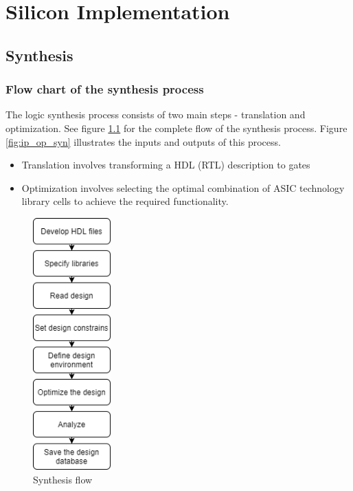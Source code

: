 \documentclass[../main.tex]{subfiles}
\begin{document}
\chapter{Silicon Implementation}
\section{Synthesis}
\subsection{Flow chart of the synthesis process}
The logic synthesis process consists of two main steps - translation and 
optimization. See figure \ref{fig:syn_flow} for the complete flow of the synthesis process. Figure \ref{fig:ip_op_syn} illustrates the inputs and outputs of this process.

\begin{itemize}
\item Translation involves transforming a HDL (RTL) description to gates
\item Optimization involves selecting the optimal combination of ASIC technology library cells to achieve the required functionality.
\end{itemize}

\begin{figure}[h]
    \centering
    \includegraphics[width=3cm]{diagrams/syn_flow.png}
    \caption{Synthesis flow}
    \label{fig:syn_flow}
\end{figure}
\end{document}
